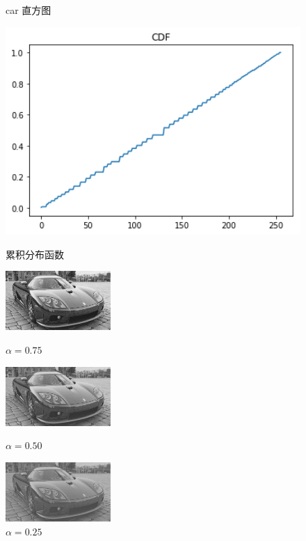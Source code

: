 \documentclass[a4paper,UTF8]{article}
\numberwithin{equation}{section}
\begin{document}
\begin{enumerate}[(\romannumeral1)]
\begin{figure}[t]
\begin{minipage}[t]{0.3\textwidth}
\caption{car 直方图}
\label{car:Pcount}
\end{minipage}
\begin{minipage}[t]{0.3\textwidth}
\centering
\includegraphics[width=1.0\textwidth]{car_processed_cdf.png}
\caption{累积分布函数}
\label{car:Pcdf}
\end{minipage}
\begin{minipage}[t]{0.3\textwidth}
\centering
\includegraphics[width=4cm]{car_processed_75.png}
\caption{ $\alpha=0.75$}
\label{car:75p}
\end{minipage}
\begin{minipage}[t]{0.3\textwidth}
\centering
\includegraphics[width=4cm]{car_processed_50.png}
\caption{  $\alpha=0.50$}
\label{car:50p}
\end{minipage}
\begin{minipage}[t]{0.3\textwidth}
\centering
\includegraphics[width=4cm]{car_processed_25.png}
\caption{ $\alpha=0.25$}
\label{car:25p}
\end{minipage}
\end{figure}


\end{enumerate}
\end{document}
